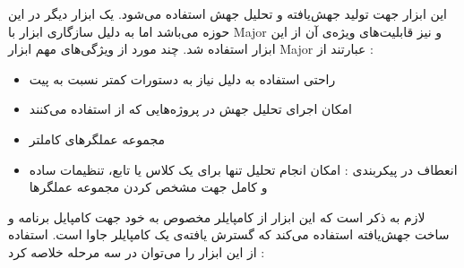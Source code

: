 این ابزار جهت تولید جهش‌یافته و تحلیل جهش استفاده می‌شود. یک ابزار دیگر در این حوزه 
 می‌باشد اما به دلیل سازگاری ابزار  با Major و نیز قابلیت‌های ویژه‌ی آن از این ابزار استفاده شد.
چند مورد از ویژگی‌های مهم ابزار Major عبارتند از :
\begin{itemize}

\item
 راحتی استفاده  به دلیل نیاز به دستورات کمتر نسبت به پیت
\item
امکان اجرای تحلیل جهش در پروژه‌هایی که از  استفاده می‌کنند
\item
 مجموعه عملگرهای کاملتر
\item
انعطاف در پیکربندی : امکان انجام تحلیل تنها برای یک کلاس یا تابع، تنظیمات ساده و کامل جهت مشخص کردن مجموعه عملگرها
\end{itemize}
لازم به ذکر است که این ابزار از کامپایلر‌ مخصوص به خود جهت کامپایل برنامه و ساخت جهش‌یافته استفاده می‌کند که گسترش یافته‌ی یک کامپایلر جاوا است. 
استفاده از این ابزار را می‌توان در سه مرحله خلاصه کرد :
